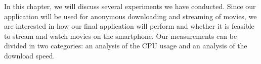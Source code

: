 In this chapter, we will discuss several experiments we have conducted. Since our application will be used for anonymous downloading and streaming of movies, we are interested in how our final application will perform and whether it is feasible to stream and watch movies on the smartphone. Our measurements can be divided in two categories: an analysis of the CPU usage and an analysis of the download speed.